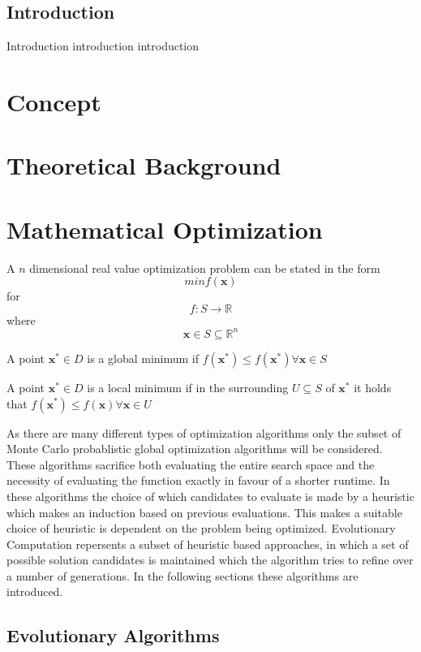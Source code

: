 \documentclass[a4paper,titlepage]{report}
\begin{document}
\section*{Introduction}
Introduction introduction introduction

\tableofcontents

\chapter{Concept}


\chapter{Theoretical Background}

\chapter{Mathematical Optimization}

A $n$ dimensional real value optimization problem can be stated in the form
\[ min f(\mathbf{x})  \]
for
\[ f: S \rightarrow  \mathbb{R} \]
where
\[ \mathbf{x} \in S  \subseteq \mathbb{R}^n \]

\noindent
A point $\mathbf{x}^* \in D$ is a global minimum if  $ f(\mathbf{x}^*) \leq f(\mathbf{x}^*)  \forall  \mathbf{x} \in S$

\noindent
A point $\mathbf{x}^* \in D$ is a local minimum if  in the surrounding  $ U \subseteq S$ of  $\mathbf{x}^*$ it holds that $f(\mathbf{x}^*)  \leq f(\mathbf{x})  \forall  \mathbf{x} \in U$

As there are many different types of optimization algorithms only the subset of Monte Carlo probablistic global optimization algorithms will be considered. These algorithms sacrifice both evaluating the entire search space and the necessity of evaluating the function exactly in favour of a shorter runtime. In these algorithms the choice of which candidates to evaluate is made by a heuristic which makes an induction based on previous evaluations. This makes a  suitable choice of heuristic is dependent on the problem being optimized. Evolutionary Computation repersents a subset of heuristic based approaches, in which a set of possible solution candidates is maintained which the algorithm tries to refine over a number of generations. In the following sections these
algorithms are introduced.

\section{Evolutionary Algorithms}
\end{document}
